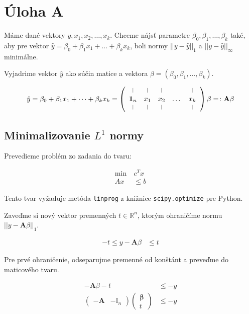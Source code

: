 \documentclass[12pt,oneside,a4paper,slovak]{article}
\newcommand*{\vertbar}{\rule[0ex]{0.3pt}{1.5ex}}
\begin{document}
   

\section*{Úloha A}

Máme dané vektory $y, x_1, x_2, \dots, x_k$. Chceme nájsť parametre $\beta_0, \beta_1,\dots,\beta_k$ také, aby pre vektor $\hat{y} = \beta_0 + \beta_1x_1 + \dots + \beta_kx_k$, boli normy $||y - \hat{y}||_1$ a $||y - \hat{y}||_{\infty}$ minimálne. 

Vyjadrime vektor $\hat{y}$ ako súčin matice a vektora $\beta = (\beta_0, \beta_1, \dots, \beta_k)$.

\begin{align*}
	\hat{y} = \beta_0 + \beta_1x_1 + \dots + \beta_kx_k = 
	\left(
		\begin{array}{ccccc}
			\vertbar & \vertbar & \vertbar &  & \vertbar \\
			\mathbf{1}_n & x_1 & x_2 & \dots & x_k \\
			\vertbar & \vertbar & \vertbar &  & \vertbar
		\end{array}
	\right)
	\beta
	=\colon
	\mathbf{A} \beta
\end{align*}

\subsection*{Minimalizovanie $L^1$ normy}

Prevedieme problém zo zadania do tvaru:

\begin{align*}
	\text{min}~ &c^Tx\\
	Ax &\leq b
\end{align*}

Tento tvar vyžaduje metóda \texttt{linprog} z knižnice \texttt{scipy.optimize} pre Python.

Zaveďme si nový vektor premenných $t \in \mathbb{R}^n$, ktorým ohraničíme normu $||y - \mathbf{A} \beta||_1$.

\begin{align*}
	-t \leq y - \mathbf{A} \beta &\leq t
\end{align*}	

Pre prvé ohraničenie, odseparujme premenné od konštánt a preveďme do maticového tvaru.

\begin{align*}
	- \mathbf{A} \beta - t &\leq -y \\
	\left(
		\begin{array}{c|c}
			-\mathbf{A} & -\mathbb{I}_n
		\end{array}
	\right)
	\left(
		\begin{array}{c}
			\boldsymbol{\beta} \\
			\hline
			t
		\end{array}
	\right) &\leq -y
\end{align*}
\end{document}

